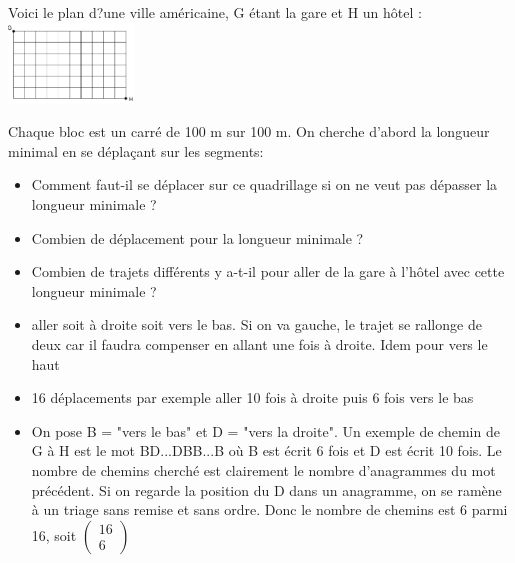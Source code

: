 \documentclass{book}
\begin{document}
\begin{Exercice}[google]
Voici le plan d?une ville américaine, G étant la gare et H un hôtel :
\includegraphics[width=0.25\textwidth]{chemin_court.png}

Chaque bloc est un carré de 100 m sur 100 m. On cherche d'abord la longueur minimal en se déplaçant sur les segments:
\begin{itemize}
\item Comment faut-il se déplacer sur ce quadrillage
si on ne veut pas dépasser la longueur minimale ?
\item  Combien de déplacement pour la longueur minimale ?
\item  Combien de trajets différents y a-t-il
pour aller de la gare à l'hôtel avec cette longueur minimale ?
\end{itemize}
\begin{Correction}
\begin{itemize}
\item aller soit à droite soit vers le bas. Si on va gauche, le trajet se rallonge de deux car il faudra compenser en allant une fois à droite. Idem pour vers le haut 
\item 16 déplacements par exemple aller 10 fois à droite puis 6 fois vers le bas
\item On pose B = "vers le bas" et D = "vers la droite". Un exemple de chemin de G à H est le mot
BD...DBB...B où B est écrit 6 fois et D est écrit 10 fois. Le nombre de chemins cherché est clairement le
nombre d'anagrammes du mot précédent. Si on regarde la position du D dans un anagramme, on se ramène à un triage sans remise et sans ordre.
Donc le nombre de chemins est 6 parmi 16, soit $\begin{pmatrix}
16\\6
\end{pmatrix}$
\end{itemize}
\end{Correction}

\end{Exercice}
\end{document}
